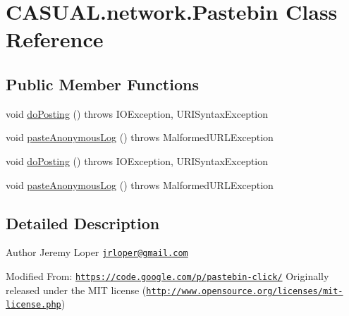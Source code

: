 \hypertarget{class_c_a_s_u_a_l_1_1network_1_1_pastebin}{\section{C\-A\-S\-U\-A\-L.\-network.\-Pastebin Class Reference}
\label{class_c_a_s_u_a_l_1_1network_1_1_pastebin}
}
\subsection*{Public Member Functions}
\begin{DoxyCompactItemize}
\item 
void \hyperlink{class_c_a_s_u_a_l_1_1network_1_1_pastebin_a668a7cf52323a030daa865aff7422d59}{do\-Posting} ()  throws I\-O\-Exception, U\-R\-I\-Syntax\-Exception 
\item 
void \hyperlink{class_c_a_s_u_a_l_1_1network_1_1_pastebin_a9984cd7ea26db5d209aaec26b85fefc5}{paste\-Anonymous\-Log} ()  throws Malformed\-U\-R\-L\-Exception 
\item 
void \hyperlink{class_c_a_s_u_a_l_1_1network_1_1_pastebin_a668a7cf52323a030daa865aff7422d59}{do\-Posting} ()  throws I\-O\-Exception, U\-R\-I\-Syntax\-Exception 
\item 
void \hyperlink{class_c_a_s_u_a_l_1_1network_1_1_pastebin_a9984cd7ea26db5d209aaec26b85fefc5}{paste\-Anonymous\-Log} ()  throws Malformed\-U\-R\-L\-Exception 
\end{DoxyCompactItemize}


\subsection{Detailed Description}
\begin{DoxyAuthor}{Author}
Jeremy Loper \href{mailto:jrloper@gmail.com}{\tt jrloper@gmail.\-com}
\end{DoxyAuthor}
Modified From\-: \href{https://code.google.com/p/pastebin-click/}{\tt https\-://code.\-google.\-com/p/pastebin-\/click/} Originally released under the M\-I\-T license (\href{http://www.opensource.org/licenses/mit-license.php}{\tt http\-://www.\-opensource.\-org/licenses/mit-\/license.\-php}) 

